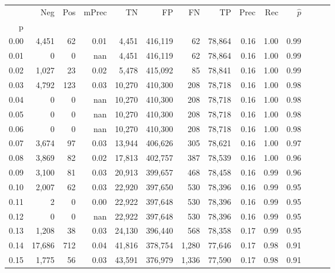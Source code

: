 \begin{tabular}{rrrrrrrrrrrrrr}
\toprule
{} &     Neg &    Pos & mPrec &       TN &       FP &      FN &      TP &  Prec &   Rec & $\hat{p}$ \\
p    &         &        &       &          &          &         &         &       &       &           \\
\midrule
0.00 &   4,451 &     62 &  0.01 &    4,451 &  416,119 &      62 &  78,864 &  0.16 &  1.00 &      0.99 \\
0.01 &       0 &      0 &   nan &    4,451 &  416,119 &      62 &  78,864 &  0.16 &  1.00 &      0.99 \\
0.02 &   1,027 &     23 &  0.02 &    5,478 &  415,092 &      85 &  78,841 &  0.16 &  1.00 &      0.99 \\
0.03 &   4,792 &    123 &  0.03 &   10,270 &  410,300 &     208 &  78,718 &  0.16 &  1.00 &      0.98 \\
0.04 &       0 &      0 &   nan &   10,270 &  410,300 &     208 &  78,718 &  0.16 &  1.00 &      0.98 \\
0.05 &       0 &      0 &   nan &   10,270 &  410,300 &     208 &  78,718 &  0.16 &  1.00 &      0.98 \\
0.06 &       0 &      0 &   nan &   10,270 &  410,300 &     208 &  78,718 &  0.16 &  1.00 &      0.98 \\
0.07 &   3,674 &     97 &  0.03 &   13,944 &  406,626 &     305 &  78,621 &  0.16 &  1.00 &      0.97 \\
0.08 &   3,869 &     82 &  0.02 &   17,813 &  402,757 &     387 &  78,539 &  0.16 &  1.00 &      0.96 \\
0.09 &   3,100 &     81 &  0.03 &   20,913 &  399,657 &     468 &  78,458 &  0.16 &  0.99 &      0.96 \\
0.10 &   2,007 &     62 &  0.03 &   22,920 &  397,650 &     530 &  78,396 &  0.16 &  0.99 &      0.95 \\
0.11 &       2 &      0 &  0.00 &   22,922 &  397,648 &     530 &  78,396 &  0.16 &  0.99 &      0.95 \\
0.12 &       0 &      0 &   nan &   22,922 &  397,648 &     530 &  78,396 &  0.16 &  0.99 &      0.95 \\
0.13 &   1,208 &     38 &  0.03 &   24,130 &  396,440 &     568 &  78,358 &  0.17 &  0.99 &      0.95 \\
0.14 &  17,686 &    712 &  0.04 &   41,816 &  378,754 &   1,280 &  77,646 &  0.17 &  0.98 &      0.91 \\
0.15 &   1,775 &     56 &  0.03 &   43,591 &  376,979 &   1,336 &  77,590 &  0.17 &  0.98 &      0.91 \\

\end{tabular}
